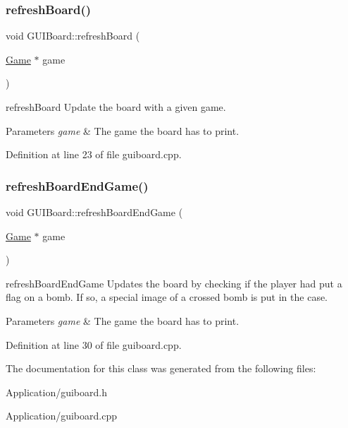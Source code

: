 \subsubsection{\texorpdfstring{refresh\+Board()}{refreshBoard()}}
{\footnotesize\ttfamily void G\+U\+I\+Board\+::refresh\+Board (\begin{DoxyParamCaption}\item[{\hyperlink{class_game}{Game} $\ast$}]{game }\end{DoxyParamCaption})}



refresh\+Board Update the board with a given game. 


\begin{DoxyParams}{Parameters}
{\em game} & The game the board has to print. \\
\hline
\end{DoxyParams}


Definition at line 23 of file guiboard.\+cpp.

\mbox{\label{class_g_u_i_board_aa6fd17a421d1b896a357e30c0cfe349d}} 
\subsubsection{\texorpdfstring{refresh\+Board\+End\+Game()}{refreshBoardEndGame()}}
{\footnotesize\ttfamily void G\+U\+I\+Board\+::refresh\+Board\+End\+Game (\begin{DoxyParamCaption}\item[{\hyperlink{class_game}{Game} $\ast$}]{game }\end{DoxyParamCaption})}



refresh\+Board\+End\+Game Updates the board by checking if the player had put a flag on a bomb. If so, a special image of a crossed bomb is put in the case. 


\begin{DoxyParams}{Parameters}
{\em game} & The game the board has to print. \\
\hline
\end{DoxyParams}


Definition at line 30 of file guiboard.\+cpp.



The documentation for this class was generated from the following files\+:\begin{DoxyCompactItemize}
\item 
Application/guiboard.\+h\item 
Application/guiboard.\+cpp\end{DoxyCompactItemize}
